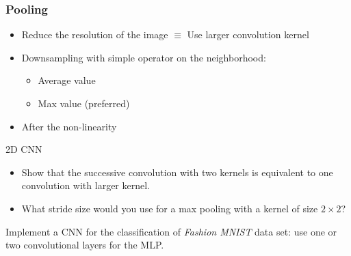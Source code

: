 \documentclass[pressentation,10pt,aspectratio=169,xcolor=table, colorlinks=true]{beamer}
\begin{document}
\begin{frame}
  \frametitle{Pooling}
  \begin{itemize}
  \item Reduce the resolution of the image \(\equiv\) Use larger convolution kernel
  \item Downsampling with simple operator on the neighborhood:
    \begin{itemize}
    \item Average value
    \item Max value (preferred)
    \end{itemize}
  \item After the non-linearity
  \end{itemize}
  \begin{center}
    \end{center}
  \end{frame}

  \begin{frame}{2D CNN}
    \begin{discussion}
      \begin{itemize}
      \item Show that the successive convolution with two kernels is equivalent to one convolution with larger kernel.
      \item What stride size would you use for a max pooling with a kernel of size \(2 \times 2\)?
      \end{itemize}
    \end{discussion}
    \begin{work}
      Implement a CNN for the classification of \emph{Fashion MNIST} data set: use one or two convolutional layers for the MLP.
    \end{work}
  \end{frame}
\end{document}
